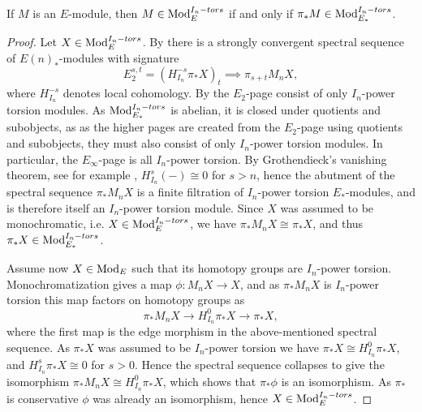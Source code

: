 \begin{lemma}
    \label{ch1:lm:monochromatic-iff-torsion-modules}
    If $M$ is an $E$-module, then $M\in \mathrm{Mod}_{E}^{I_n-tors}$ if and only if $\pi_* M\in \mathrm{Mod}_{E_*}^{I_n-tors}$. 
\end{lemma}
\begin{proof}
    Let $X\in \mathrm{Mod}_{E}^{I_n-tors}$. By \cite[3.19]{barthel-heard-valenzuela_2018} there is a strongly convergent spectral sequence of $E(n)_*$-modules with signature 
    $$E_2^{s,t} = (H_{I_n}^{-s}\pi_* X)_t \implies \pi_{s+t}M_n X,$$
    where $H_{I_n}^{-s}$ denotes local cohomology. By \cite[2.1.3(ii)]{brodmann-sharp_1998} the $E_2$-page consist of only $I_n$-power torsion modules. As $\mathrm{Mod}_{E_*}^{I_n-tors}$ is abelian, it is closed under quotients and subobjects, as as the higher pages are created from the $E_2$-page using quotients and subobjects, they must also consist of only $I_n$-power torsion modules. In particular, the $E_\infty$-page is all $I_n$-power torsion. By Grothendieck's vanishing theorem, see for example \cite[6.1.2]{brodmann-sharp_1998}, $H_{I_n}^s(-)\cong 0$ for $s>n$, hence the abutment of the spectral sequence $\pi_* M_n X$ is a finite filtration of $I_n$-power torsion $E_*$-modules, and is therefore itself an $I_n$-power torsion module. Since $X$ was assumed to be monochromatic, i.e. $X\in \mathrm{Mod}_{E}^{I_n-tors}$, we have $\pi_* M_n X\cong \pi_* X$, and thus $\pi_* X\in \mathrm{Mod}_{E_*}^{I_n-tors}$. 

    Assume now $X\in \mathrm{Mod}_{E}$ such that its homotopy groups are $I_n$-power torsion. Monochromatization gives a map $\phi\colon M_n X\longrightarrow X$, and as $\pi_*M_nX$ is $I_n$-power torsion this map factors on homotopy groups as 
    $$\pi_* M_n X\longrightarrow H^0_{I_n}\pi_* X\longrightarrow \pi_* X,$$
    where the first map is the edge morphism in the above-mentioned spectral sequence. As $\pi_* X$ was assumed to be $I_n$-power torsion we have $\pi_*X\cong H^0_{I_n}\pi_* X$, and $H^s_{I_n}\pi_* X \cong 0$ for $s>0$. Hence the spectral sequence collapses to give the isomorphism $\pi_* M_n X\cong H^0_{I_n}\pi_* X$, which shows that $\pi_* \phi$ is an isomorphism. As $\pi_*$ is conservative $\phi$ was already an isomorphism, hence $X\in \mathrm{Mod}_{E}^{I_n-tors}$. 
\end{proof}

